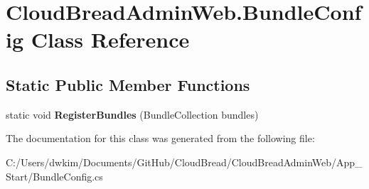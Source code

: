 \hypertarget{class_cloud_bread_admin_web_1_1_bundle_config}{}\section{Cloud\+Bread\+Admin\+Web.\+Bundle\+Config Class Reference}
\label{class_cloud_bread_admin_web_1_1_bundle_config}
\subsection*{Static Public Member Functions}
\begin{DoxyCompactItemize}
\item 
static void {\bfseries Register\+Bundles} (Bundle\+Collection bundles)\hypertarget{class_cloud_bread_admin_web_1_1_bundle_config_a9533a2d4ad40e7376c4fa62b1cf1d47d}{}\label{class_cloud_bread_admin_web_1_1_bundle_config_a9533a2d4ad40e7376c4fa62b1cf1d47d}

\end{DoxyCompactItemize}


The documentation for this class was generated from the following file\+:\begin{DoxyCompactItemize}
\item 
C\+:/\+Users/dwkim/\+Documents/\+Git\+Hub/\+Cloud\+Bread/\+Cloud\+Bread\+Admin\+Web/\+App\+\_\+\+Start/Bundle\+Config.\+cs\end{DoxyCompactItemize}
